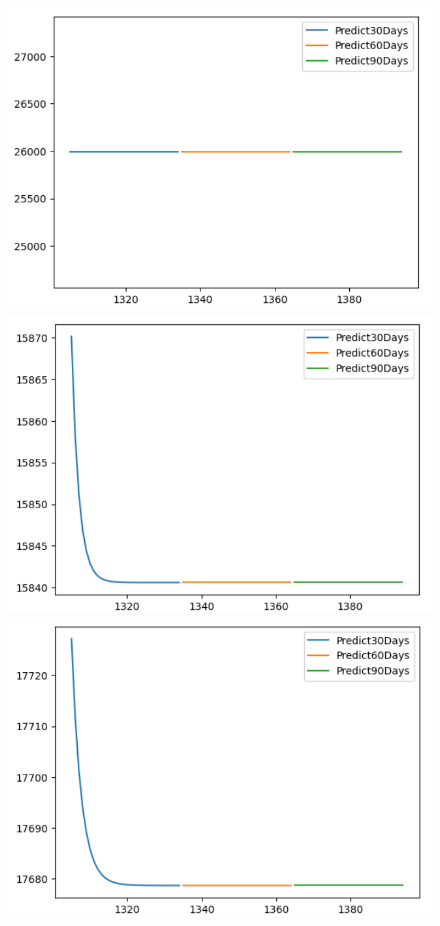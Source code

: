\begin{figure}[H]
\begin{minipage}{0.15\textwidth}
    \includegraphics[width=1\textwidth]{resources/chapter-5/newdata1/predicted/EIB_ARIMA_7-3_30days.png}
    \end{minipage}
    \hfill
    \begin{minipage}{0.15\textwidth}
    \centering
    \includegraphics[width=1\textwidth]{resources/chapter-5/newdata1/predicted/EIB_ARIMA_8-2_30days.png}
    \end{minipage}
    \hfill
        \begin{minipage}{0.15\textwidth}
    \centering
    \includegraphics[width=1\textwidth]{resources/chapter-5/newdata1/predicted/EIB_ARIMA_9-1_30days.png}

\end{minipage}
\end{figure}
